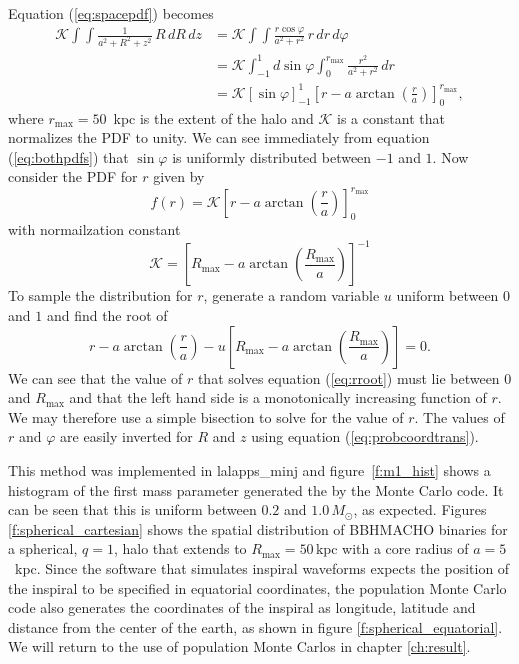 Equation (\ref{eq:spacepdf}) becomes
\begin{equation}
\begin{split}
\mathcal{K} \int\int \frac{1}{a^2 + R^2 + z^2}\,R\, dR\, dz 
&= \mathcal{K} \int\int \frac{r\cos\varphi}{a^2+r^2}\,r\, dr \, d\varphi \\
&= \mathcal{K} \int_{-1}^{1} d\sin\varphi \int_0^{r_{\mathrm{max}}} \frac{r^2}{a^2+r^2}\, dr \\
&= \mathcal{K} \left[\sin\varphi\right]_{-1}^1 \left[r -
a\arctan\left(\frac{r}{a}\right)\right]_0^{r_{\mathrm{max}}},
\end{split}
\label{eq:bothpdfs}
\end{equation}
where $r_\mathrm{max} = 50$~kpc is the extent of the halo and $\mathcal{K}$ is
a constant that normalizes the PDF to unity. We can see immediately from
equation (\ref{eq:bothpdfs}) that $\sin\varphi$ is uniformly
distributed between $-1$ and $1$. Now consider the PDF for $r$ given by
\begin{equation}
f(r) = \mathcal{K} \left[r - a\arctan\left(\frac{r}{a}\right)\right]_0^{r_{\mathrm{max}}}
\end{equation}
with normailzation constant
\begin{equation}
\mathcal{K} = 
\left[R_\mathrm{max} -
a\arctan\left(\frac{R_\mathrm{max}}{a}\right)\right]^{-1}
\end{equation}
To sample the distribution for $r$, generate a random variable $u$
uniform between $0$ and $1$ and find the root of
\begin{equation}
r - a\arctan\left(\frac{r}{a}\right) - u \left[R_\mathrm{max} -
a\arctan\left(\frac{R_\mathrm{max}}{a}\right)\right] = 0.
\label{eq:rroot}
\end{equation}
We can see that the value of $r$ that solves equation (\ref{eq:rroot}) must
lie between $0$ and $R_\mathrm{max}$ and that the left hand side is a
monotonically increasing function of $r$. We may therefore use a simple 
bisection to solve for the value of $r$. The values of $r$
and $\varphi$ are easily inverted for $R$ and $z$ using equation
(\ref{eq:probcoordtrans}). 

This method was implemented in lalapps\_minj and figure~\ref{f:m1_hist} shows
a histogram of the first mass parameter generated the by the Monte Carlo code.
It can be seen that this is uniform between $0.2$ and $1.0\,M_\odot$, as
expected. Figures \ref{f:spherical_cartesian} shows the spatial distribution
of BBHMACHO binaries for a spherical, $q=1$, halo that extends to
$R_\mathrm{max} = 50\,\mathrm{kpc}$ with a core radius of $a = 5$~kpc.  Since
the software that simulates inspiral waveforms expects the position of the
inspiral to be specified in equatorial coordinates, the population Monte Carlo
code also generates the coordinates of the inspiral as longitude, latitude and
distance from the center of the earth, as shown in figure
\ref{f:spherical_equatorial}.  We will return to the use of population Monte
Carlos in chapter \ref{ch:result}.

